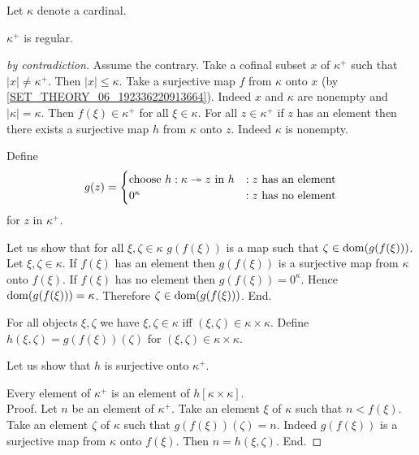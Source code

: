 \documentclass{article}
\begin{document}
  \begin{forthel}
    Let $\kappa$ denote a cardinal.

    \begin{theorem*}[Hausdorff]
      $\kappa^{+}$ is regular.
    \end{theorem*}
    \begin{proof}[by contradiction]
      Assume the contrary.
      Take a cofinal subset $x$ of $\kappa^{+}$ such that $|x| \neq \kappa^{+}$.
      Then $|x| \leq \kappa$.
      Take a surjective map $f$ from $\kappa$ onto $x$
      (by \ref{SET_THEORY_06_192336220913664}).
      Indeed $x$ and $\kappa$ are nonempty and $|\kappa| = \kappa$.
      Then $f(\xi) \in \kappa^{+}$ for all $\xi \in \kappa$.
      For all $z \in \kappa^{+}$ if $z$ has an element then there exists a
      surjective map $h$ from $\kappa$ onto $z$.
      Indeed $\kappa$ is nonempty.

      Define \[ g(z) =
        \begin{cases}
          \text{choose $h : \kappa \twoheadrightarrow z$ in $h$}
          & : \text{$z$ has an element}
          \\
          \text{$0^{\kappa}$}
          & : \text{$z$ has no element}
        \end{cases}
      \] for $z$ in $\kappa^{+}$.

      Let us show that for all $\xi, \zeta \in \kappa$ $g(f(\xi))$ is a map such
      that $\zeta \in \operatorname{dom}(g(f(\xi)))$.
        Let $\xi, \zeta \in \kappa$.
        If $f(\xi)$ has an element then $g(f(\xi))$ is a surjective map from
        $\kappa$ onto $f(\xi)$.
        If $f(\xi)$ has no element then $g(f(\xi)) = 0^{\kappa}$.
        Hence $\operatorname{dom}(g(f(\xi))) = \kappa$.
        Therefore $\zeta \in \operatorname{dom}(g(f(\xi)))$.
      End.

      For all objects $\xi, \zeta$ we have $\xi, \zeta \in \kappa$ iff
      $(\xi, \zeta) \in \kappa \times \kappa$.
      Define $h(\xi,\zeta) = g(f(\xi))(\zeta)$ for $(\xi,\zeta) \in \kappa
      \times \kappa$.

      Let us show that $h$ is surjective onto $\kappa^{+}$.

        Every element of $\kappa^{+}$ is an element of $h[\kappa \times
        \kappa]$. \\
        Proof.
          Let $n$ be an element of $\kappa^{+}$.
          Take an element $\xi$ of $\kappa$ such that $n < f(\xi)$.
          Take an element $\zeta$ of $\kappa$ such that $g(f(\xi))(\zeta) = n$.
          Indeed $g(f(\xi))$ is a surjective map from $\kappa$ onto $f(\xi)$.
          Then $n = h(\xi,\zeta)$.
        End.


\end{proof}
\end{forthel}
\end{document}
